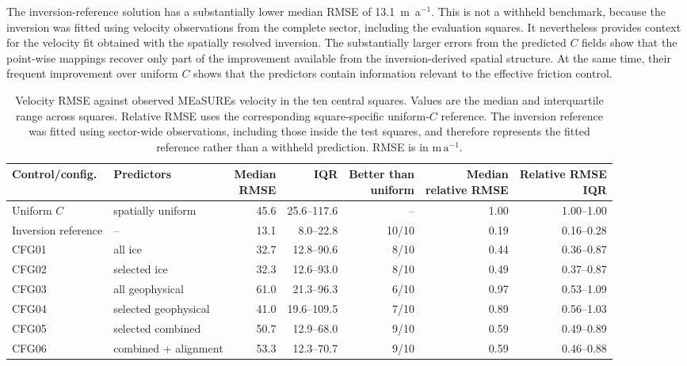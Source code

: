\documentclass[review,jog]{igs}
\providecommand{\toprule}{\hline}
\providecommand{\midrule}{\hline}
\providecommand{\bottomrule}{\hline}
\begin{document}
The inversion-reference solution has a substantially lower median RMSE of
13.1~m~a$^{-1}$. This is not a withheld benchmark, because the inversion was
fitted using velocity observations from the complete sector, including the
evaluation squares. It nevertheless provides context for the velocity fit
obtained with the spatially resolved inversion. The substantially larger errors
from the predicted $C$ fields show that the point-wise mappings recover only
part of the improvement available from the inversion-derived spatial structure.
At the same time, their frequent improvement over uniform $C$ shows that the
predictors contain information relevant to the effective friction control.

\begin{table}
\caption{Velocity RMSE against observed MEaSUREs velocity in the ten central
squares. Values are the median and interquartile range across squares.
Relative RMSE uses the corresponding square-specific uniform-$C$ reference. The inversion reference was fitted using sector-wide observations,
including those inside the test squares, and therefore represents the fitted
reference rather than a withheld prediction. RMSE is in
$\mathrm{m\,a^{-1}}$.}
\label{tab:performance_summary}
\centering\small
\ifdefined\FinalPass\setlength{\tabcolsep}{4pt}\fi
\begin{tabular}{llrrrrr}
\toprule
Control/config. & Predictors & \shortstack{Median\\RMSE} & IQR & \shortstack{Better than\\uniform} & \shortstack{Median\\relative RMSE} & \shortstack{Relative RMSE\\IQR}\\
\midrule
Uniform $C$ & spatially uniform & 45.6 & 25.6--117.6 &
-- & 1.00 & 1.00--1.00\\
Inversion reference & -- & 13.1 & 8.0--22.8 &
10/10 & 0.19 & 0.16--0.28\\
\midrule
CFG01 & all ice & 32.7 & 12.8--90.6 &
8/10 & 0.44 & 0.36--0.87\\
CFG02 & selected ice & 32.3 & 12.6--93.0 &
8/10 & 0.49 & 0.37--0.87\\
CFG03 & all geophysical & 61.0 & 21.3--96.3 &
6/10 & 0.97 & 0.53--1.09\\
CFG04 & selected geophysical & 41.0 & 19.6--109.5 &
7/10 & 0.89 & 0.56--1.03\\
CFG05 & selected combined & 50.7 & 12.9--68.0 &
9/10 & 0.59 & 0.49--0.89\\
CFG06 & combined + alignment & 53.3 & 12.3--70.7 &
9/10 & 0.59 & 0.46--0.88\\
\bottomrule
\end{tabular}
\end{table}
\end{document}
